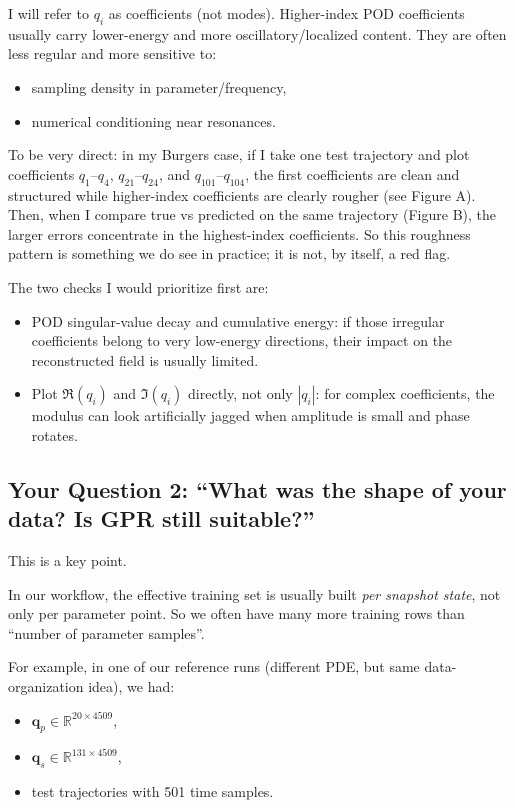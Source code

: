\documentclass[11pt]{article}
\newcommand{\vect}[1]{\mathbf{#1}}
\begin{document}
I will refer to \(q_i\) as coefficients (not modes). Higher-index POD coefficients usually carry lower-energy and more oscillatory/localized content. They are often less regular and more sensitive to:
\begin{itemize}[leftmargin=1.5em]
    \item sampling density in parameter/frequency,
    \item numerical conditioning near resonances.
\end{itemize}

To be very direct: in my Burgers case, if I take one test trajectory and plot coefficients \(q_1\)--\(q_4\), \(q_{21}\)--\(q_{24}\), and \(q_{101}\)--\(q_{104}\), the first coefficients are clean and structured while higher-index coefficients are clearly rougher (see Figure A). Then, when I compare true vs predicted on the same trajectory (Figure B), the larger errors concentrate in the highest-index coefficients. So this roughness pattern is something we do see in practice; it is not, by itself, a red flag.

The two checks I would prioritize first are:
\begin{itemize}[leftmargin=1.5em]
    \item POD singular-value decay and cumulative energy: if those irregular coefficients belong to very low-energy directions, their impact on the reconstructed field is usually limited.
    \item Plot \(\Re(q_i)\) and \(\Im(q_i)\) directly, not only \(|q_i|\): for complex coefficients, the modulus can look artificially jagged when amplitude is small and phase rotates.
\end{itemize}

\subsection*{Your Question 2: ``What was the shape of your data? Is GPR still suitable?''}

This is a key point.

In our workflow, the effective training set is usually built \emph{per snapshot state}, not only per parameter point. So we often have many more training rows than ``number of parameter samples''.

For example, in one of our reference runs (different PDE, but same data-organization idea), we had:
\begin{itemize}[leftmargin=1.5em]
    \item \(\vect{q}_p \in \mathbb{R}^{20 \times 4509}\),
    \item \(\vect{q}_s \in \mathbb{R}^{131 \times 4509}\),
    \item test trajectories with 501 time samples.
\end{itemize}
\end{document}
